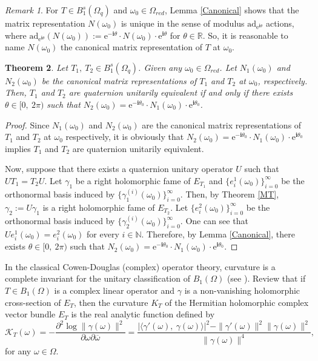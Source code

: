 \documentclass[pdflatex,sn-mathphys-num]{sn-jnl}%
\theoremstyle{thmstyleone}%
\newtheorem{theorem}{Theorem}%
\theoremstyle{thmstyletwo}%
\newtheorem{remark}{Remark}%
\theoremstyle{thmstylethree}%
\newtheorem{theorem}{Theorem}[section]
\theoremstyle{definition}
\theoremstyle{remark}
\newtheorem{remark}[theorem]{Remark}
\begin{document}
\begin{remark}
	For $T\in B_1^{s}(\Omega_q)$ and $\omega_0\in\Omega_{red}$,  Lemma \ref{Canonical} shows that the matrix representation $N(\omega_0)$ is unique in the sense of modulus $\mathrm{ad}_{\mathrm{e}^{\boldsymbol{i}\theta}}$ actions, where $\mathrm{ad}_{\mathrm{e}^{\boldsymbol{i}\theta}}(N(\omega_0)):=\mathrm{e}^{-\boldsymbol{i}\theta}\cdot N(\omega_0) \cdot\mathrm{e}^{\boldsymbol{i}\theta}$ for $\theta\in\mathbb{R}$. So, it is reasonable to name $N(\omega_0)$ the canonical matrix representation of $T$ at $\omega_0$.
\end{remark}

    \begin{theorem}\label{CbyC}
Let $T_1,\ T_2\in B_1^{s}(\Omega_q)$.  Given any $\omega_0\in\Omega_{red}$. Let $N_1(\omega_0)$ and $N_2(\omega_0)$ be the canonical matrix representations of $T_1$ and $T_2$ at $\omega_0$, respectively.
Then, $T_1$ and $T_2$ are quaternion unitarily equivalent if and only if
there exists $\theta\in[0,\ 2\pi)$ such that $N_2(\omega_0)=\mathrm{e}^{-\boldsymbol{i}\theta_0}\cdot N_1(\omega_0) \cdot\mathrm{e}^{\boldsymbol{i}\theta_0}$.
\end{theorem}
    \begin{proof}
 Since $N_1(\omega_0)$ and $N_2(\omega_0)$ are the canonical matrix representations of $T_1$ and $T_2$ at $\omega_0$ respectively, it is obviously that $N_2(\omega_0)=\mathrm{e}^{-\boldsymbol{i}\theta_0}\cdot N_1(\omega_0) \cdot\mathrm{e}^{\boldsymbol{i}\theta_0}$ implies $T_1$ and $T_2$ are quaternion unitarily equivalent.

 Now, suppose that there exists a quaternion unitary operator $U$ such that $UT_1=T_2U$. Let $\gamma_1$ be a right holomorphic fame of $E_{T_1}$ and $\{e_i^1(\omega_0)\}_{i=0}^{\infty}$ be the orthonormal basis induced by $\{\gamma_1^{(i)}(\omega_0)\}_{i=0}^{\infty}$. Then, by Theorem \ref{MT}, $\gamma_2:=U\gamma_1$ is a right holomorphic fame of $E_{T_2}$. Let $\{e_i^2(\omega_0)\}_{i=0}^{\infty}$ be the orthonormal basis induced by $\{\gamma_2^{(i)}(\omega_0)\}_{i=0}^{\infty}$. One can see that $Ue_i^1(\omega_0)=e_i^2(\omega_0)$ for every $i\in\mathbb{N}$. Therefore, by Lemma \ref{Canonical}, there exists $\theta\in[0,\ 2\pi)$ such that $N_2(\omega_0)=\mathrm{e}^{-\boldsymbol{i}\theta_0}\cdot N_1(\omega_0) \cdot\mathrm{e}^{\boldsymbol{i}\theta_0}$.
  \end{proof}

In the classical Cowen-Douglas (complex) operator theory, curvature is a complete invariant for the unitary classification of $B_1(\Omega)$ (see \cite{CD}). Review that if $T\in B_1(\Omega)$ is a complex linear operator and $\gamma$ is a non-vanishing holomorphic cross-section of $E_{T}$, then the curvature $K_T$ of the Hermitian holomorphic complex vector bundle $E_T$ is the real analytic function defined by
$$
\mathcal{K}_T(\omega)=-\frac{\partial^2 \log \|\gamma(\omega)\|^2}{\partial\omega\partial\overline{\omega}}=\frac{|\langle\gamma'(\omega),\ \gamma(\omega)\rangle|^2-\|\gamma'(\omega)\|^2\|\gamma(\omega)\|^2}{\|\gamma(\omega)\|^4},
$$
for any $\omega\in\Omega$.
\end{document}
